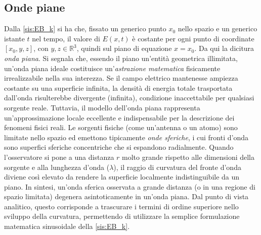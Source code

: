 \documentclass[a4paper,11pt]{report}
\begin{document}
\subsection{Onde piane}
Dalla \eqref{sis:EB_k} si ha che, fissato un generico punto $x_0$ nello spazio e un generico istante $t$ nel tempo, il valore di $E(x,t)$ è costante per ogni punto di coordinate $[x_0, y, z]$, con $y,z \in \mathbb{R}^3$, quindi sul piano di equazione $x = x_0$. Da qui la dicitura \textit{onda piana}. Si segnala che, essendo il piano un'entità geometrica illimitata, un'onda piana ideale costituisce un'\textit{astrazione matematica} fisicamente irrealizzabile nella sua interezza. Se il campo elettrico mantenesse ampiezza costante su una superficie infinita, la densità di energia totale trasportata dall'onda risulterebbe divergente (infinita), condizione inaccettabile per qualsiasi sorgente reale.
Tuttavia, il modello dell'onda piana rappresenta un'approssimazione locale eccellente e indispensabile per la descrizione dei fenomeni fisici reali.
Le sorgenti fisiche (come un'antenna o un atomo) sono limitate nello spazio ed emettono tipicamente \textit{onde sferiche}, i cui fronti d'onda sono superfici sferiche concentriche che si espandono radialmente.
Quando l'osservatore si pone a una distanza $r$ molto grande rispetto alle dimensioni della sorgente e alla lunghezza d'onda ($\lambda$), il raggio di curvatura del fronte d'onda diviene così elevato da rendere la superficie localmente indistinguibile da un piano.
In sintesi, un'onda sferica osservata a grande distanza (o in una regione di spazio limitata) degenera asintoticamente in un'onda piana.
Dal punto di vista analitico, questo corrisponde a trascurare i termini di ordine superiore nello sviluppo della curvatura, permettendo di utilizzare la semplice formulazione matematica sinusoidale della \eqref{sis:EB_k}.
\end{document}
